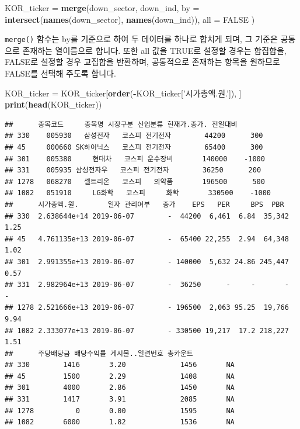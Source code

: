 \documentclass[]{book}
\newenvironment{Shaded}{\begin{snugshade}}{\end{snugshade}}
\newcommand{\DataTypeTok}[1]{\textcolor[rgb]{0.13,0.29,0.53}{#1}}
\newcommand{\KeywordTok}[1]{\textcolor[rgb]{0.13,0.29,0.53}{\textbf{#1}}}
\newcommand{\NormalTok}[1]{#1}
\newcommand{\OperatorTok}[1]{\textcolor[rgb]{0.81,0.36,0.00}{\textbf{#1}}}
\newcommand{\OtherTok}[1]{\textcolor[rgb]{0.56,0.35,0.01}{#1}}
\newcommand{\StringTok}[1]{\textcolor[rgb]{0.31,0.60,0.02}{#1}}
\begin{document}
\begin{Shaded}
\begin{Highlighting}[]
\NormalTok{KOR_ticker =}\StringTok{ }\KeywordTok{merge}\NormalTok{(down_sector, down_ind,}
                   \DataTypeTok{by =} \KeywordTok{intersect}\NormalTok{(}\KeywordTok{names}\NormalTok{(down_sector), }\KeywordTok{names}\NormalTok{(down_ind)),}
                   \DataTypeTok{all =} \OtherTok{FALSE}
\NormalTok{    )}
\end{Highlighting}
\end{Shaded}

\texttt{merge()} 함수는 by를 기준으로 하여 두 데이터를 하나로 합치게 되며, 그 기준은 공통으로 존재하는 열이름으로 합니다. 또한 all 값을 TRUE로 설정할 경우는 합집합을, FALSE로 설정할 경우 교집합을 반환하며, 공통적으로 존재하는 항목을 원하므로 FALSE를 선택해 주도록 합니다.

\begin{Shaded}
\begin{Highlighting}[]
\NormalTok{KOR_ticker =}\StringTok{ }\NormalTok{KOR_ticker[}\KeywordTok{order}\NormalTok{(}\OperatorTok{-}\NormalTok{KOR_ticker[}\StringTok{'시가총액.원.'}\NormalTok{]), ]}
\KeywordTok{print}\NormalTok{(}\KeywordTok{head}\NormalTok{(KOR_ticker))}
\end{Highlighting}
\end{Shaded}

\begin{verbatim}
##      종목코드     종목명 시장구분 산업분류 현재가.종가. 전일대비
## 330    005930   삼성전자   코스피 전기전자        44200      300
## 45     000660 SK하이닉스   코스피 전기전자        65400      300
## 301    005380     현대차   코스피 운수장비       140000    -1000
## 331    005935 삼성전자우   코스피 전기전자        36250      200
## 1278   068270   셀트리온   코스피   의약품       196500      500
## 1082   051910     LG화학   코스피     화학       330500    -1000
##      시가총액.원.       일자 관리여부   종가    EPS   PER     BPS  PBR
## 330  2.638644e+14 2019-06-07        -  44200  6,461  6.84  35,342 1.25
## 45   4.761135e+13 2019-06-07        -  65400 22,255  2.94  64,348 1.02
## 301  2.991355e+13 2019-06-07        - 140000  5,632 24.86 245,447 0.57
## 331  2.982964e+13 2019-06-07        -  36250      -     -       -    -
## 1278 2.521666e+13 2019-06-07        - 196500  2,063 95.25  19,766 9.94
## 1082 2.333077e+13 2019-06-07        - 330500 19,217  17.2 218,227 1.51
##      주당배당금 배당수익률 게시물..일련번호 총카운트
## 330        1416       3.20             1456       NA
## 45         1500       2.29             1408       NA
## 301        4000       2.86             1450       NA
## 331        1417       3.91             2085       NA
## 1278          0       0.00             1595       NA
## 1082       6000       1.82             1536       NA
\end{verbatim}
\end{document}
